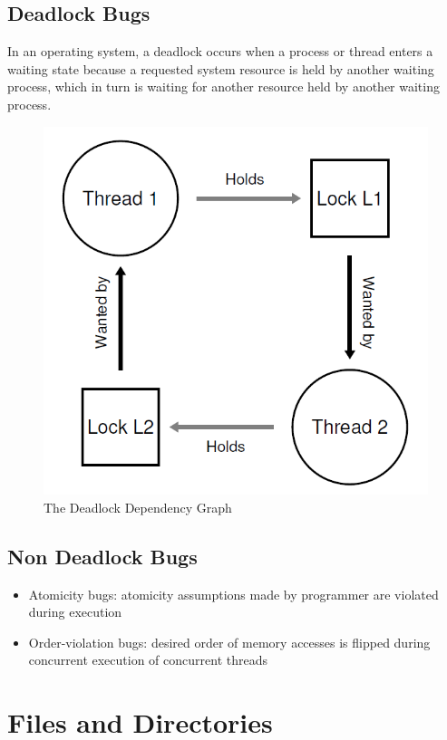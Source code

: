 \documentclass{article}
\begin{document}
\subsection{Deadlock Bugs}
In an operating system, a deadlock occurs when a process or thread enters a waiting state because a requested system resource is held by another waiting process, which in turn is waiting for another resource held by another waiting process.
    \begin{figure}[ht]
    \centering
    \includegraphics[scale = 0.3]{img/Deadblock.png}
    \caption{The Deadlock Dependency Graph}
    \end{figure}
\subsection{Non Deadlock Bugs}
\begin{itemize}
    \item Atomicity bugs: atomicity assumptions made by programmer are violated during execution
    \item Order-violation bugs: desired order of memory accesses is flipped during concurrent execution of concurrent threads
\end{itemize}
\section{Files and Directories}
\end{document}
